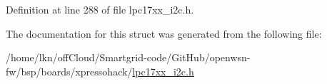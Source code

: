 Definition at line 288 of file lpc17xx\+\_\+i2c.\+h.



The documentation for this struct was generated from the following file\+:\begin{DoxyCompactItemize}
\item 
/home/lkn/off\+Cloud/\+Smartgrid-\/code/\+Git\+Hub/openwsn-\/fw/bsp/boards/xpressohack/\hyperlink{lpc17xx__i2c_8h}{lpc17xx\+\_\+i2c.\+h}\end{DoxyCompactItemize}
